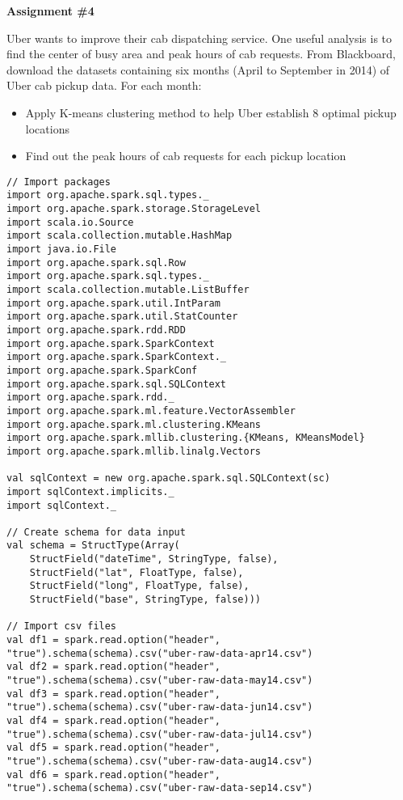 \documentclass[11pt]{article}
\newcommand{\ques}[1]{\noindent {\bf Question #1: }}
\begin{document}
\begin{center} \textbf{Assignment \#4} \end{center}

\ques{1} Uber wants to improve their cab dispatching service. One useful analysis is to find the center of busy area and peak hours of cab requests. From Blackboard, download the datasets containing six months (April to September in 2014) of Uber cab pickup data. For each month: 
\begin{itemize} 
\item Apply K-means clustering method to help Uber establish $8$ optimal pickup locations
\item Find out the peak hours of cab requests for each pickup location \end{itemize}
\begin{lstlisting}
// Import packages 
import org.apache.spark.sql.types._
import org.apache.spark.storage.StorageLevel
import scala.io.Source
import scala.collection.mutable.HashMap
import java.io.File
import org.apache.spark.sql.Row
import org.apache.spark.sql.types._
import scala.collection.mutable.ListBuffer
import org.apache.spark.util.IntParam
import org.apache.spark.util.StatCounter
import org.apache.spark.rdd.RDD
import org.apache.spark.SparkContext
import org.apache.spark.SparkContext._
import org.apache.spark.SparkConf
import org.apache.spark.sql.SQLContext
import org.apache.spark.rdd._
import org.apache.spark.ml.feature.VectorAssembler
import org.apache.spark.ml.clustering.KMeans
import org.apache.spark.mllib.clustering.{KMeans, KMeansModel} 
import org.apache.spark.mllib.linalg.Vectors

val sqlContext = new org.apache.spark.sql.SQLContext(sc)
import sqlContext.implicits._
import sqlContext._

// Create schema for data input
val schema = StructType(Array(
	StructField("dateTime", StringType, false),
	StructField("lat", FloatType, false),
	StructField("long", FloatType, false),
	StructField("base", StringType, false)))

// Import csv files 
val df1 = spark.read.option("header", "true").schema(schema).csv("uber-raw-data-apr14.csv")
val df2 = spark.read.option("header", "true").schema(schema).csv("uber-raw-data-may14.csv")
val df3 = spark.read.option("header", "true").schema(schema).csv("uber-raw-data-jun14.csv")
val df4 = spark.read.option("header", "true").schema(schema).csv("uber-raw-data-jul14.csv")
val df5 = spark.read.option("header", "true").schema(schema).csv("uber-raw-data-aug14.csv")
val df6 = spark.read.option("header", "true").schema(schema).csv("uber-raw-data-sep14.csv")



\end{lstlisting}
\end{document}
